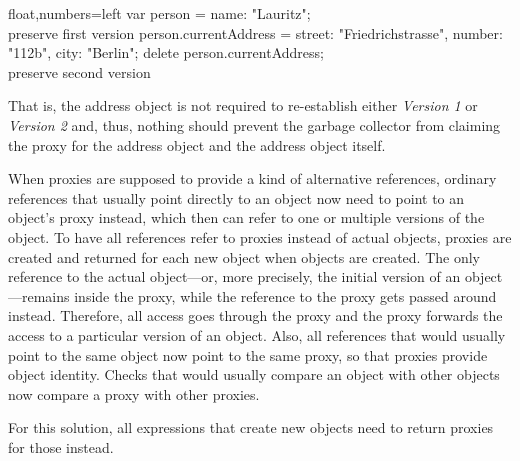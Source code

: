 \begin{code}{}{float,numbers=left}
    var person = {name: "Lauritz"};
    \\ preserve first version
    person.currentAddress = {street: "Friedrichstrasse",
                         number: "112b",
                         city: "Berlin"};
    delete person.currentAddress;
    \\ preserve second version
\end{code}
\iffalse
\end{verbatim}\fi

That is, the address object is not required to re-establish either \emph{Version 1} or \emph{Version 2} and, thus, nothing should prevent the garbage collector from claiming the proxy for the address object and the address object itself.








When proxies are supposed to provide a kind of alternative references, ordinary references that usually point directly to an object now need to point to an object's proxy instead, which then can refer to one or multiple versions of the object.
To have all references refer to proxies instead of actual objects, proxies are created and returned for each new object when objects are created.
The only reference to the actual object---or, more precisely, the initial version of an object---remains inside the proxy, while the reference to the proxy gets passed around instead.
Therefore, all access goes through the proxy and the proxy forwards the access to a particular version of an object.
Also, all references that would usually point to the same object now point to the same proxy, so that proxies provide object identity.
Checks that would usually compare an object with other objects now compare a proxy with other proxies.

For this solution, all expressions that create new objects need to return proxies for those instead.

